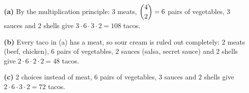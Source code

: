\textbf{(a)} By the multiplication principle: $3$ meats, $\dbinom42=6$ pairs of vegetables, $3$ sauces and $2$ shells give $3\cdot6\cdot3\cdot2=\boxed{108}$ tacos.

\textbf{(b)} Every taco in (a) has a meat, so sour cream is ruled out completely: $2$ meats (beef, chicken), $6$ pairs of vegetables, $2$ sauces (salsa, secret sauce) and $2$ shells give $2\cdot6\cdot2\cdot2=\boxed{48}$ tacos.

\textbf{(c)} $2$ choices instead of meat, $6$ pairs of vegetables, $3$ sauces and $2$ shells give $2\cdot6\cdot3\cdot2=\boxed{72}$ tacos.
